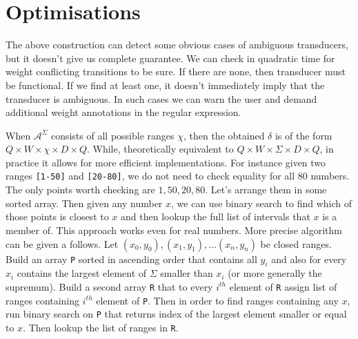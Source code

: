 \documentclass[journal]{journal}
\begin{document}
\section{Optimisations}

The above construction can detect some obvious cases of ambiguous transducers, but it doesn't give us complete guarantee. We can check in quadratic time\cite{Marie-Pierre} for weight conflicting transitions to be sure. If there are none, then transducer must be functional. If we find at least one, it doesn't immediately imply that the transducer is ambiguous. In such cases we can warn the user and demand additional weight annotations in the regular expression. 

When $\mathcal{A}^\Sigma$ consists of all possible ranges  $\chi$, then the obtained $\delta$ is of the form $Q\times  W \times \chi \times D \times Q$. While, theoretically equivalent to $Q\times  W \times \Sigma \times D \times Q$, in practice it allows for more efficient implementations. For instance given two ranges \texttt{[1-50]} and \texttt{[20-80]}, we do not need to check equality for all $80$ numbers. The only points worth checking are $1,50,20,80$. Let's arrange them in some sorted array. Then given any number $x$, we can use binary search to find which of those points is closest to $x$ and then lookup the full list of intervals that $x$ is a member of. This approach works even for real numbers. More precise algorithm can be given a follows. Let $(x_0,y_0),(x_1,y_1),...(x_n,y_n)$ be closed ranges. Build an array \texttt{P} sorted in ascending order that contains all $y_i$ and also for every $x_i$ contains the largest element of $\Sigma$ smaller than $x_i$ (or more generally the supremum). Build a second array \texttt{R} that to every $i^{th}$ element of \texttt{R} assign list of ranges containing  $i^{th}$ element of \texttt{P}. Then in order to find ranges containing any $x$, run binary search on \texttt{P} that returns index of the largest element smaller or equal to $x$. Then lookup the list of ranges in \texttt{R}. 
\end{document}

